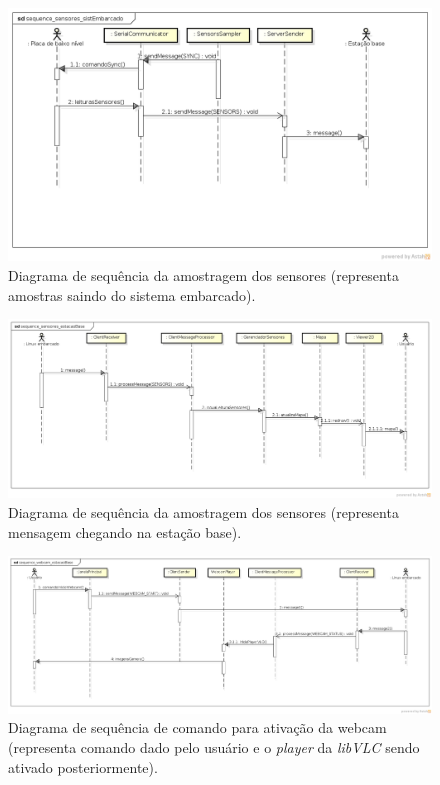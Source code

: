 \begin{figure}[H]
  \centering
  \includegraphics[width=\textwidth, keepaspectratio]{./figuras/sistEmbarcado/sequence_sensores_sistEmbarcado.png}
  \caption{Diagrama de sequência da amostragem dos sensores (representa amostras saindo do sistema embarcado).}
  \label{fig:diagrama_sequencia_sensores_sist_embarcado}
\end{figure}

\begin{figure}[H]
  \centering
  \includegraphics[width=\textwidth, keepaspectratio]{./figuras/estacaoBase/sequence_sensores_estacaoBase.png}
  \caption{Diagrama de sequência da amostragem dos sensores (representa mensagem chegando na estação base).}
  \label{fig:diagrama_sequencia_sensores_estacao_base}
\end{figure}

\begin{figure}[H]
  \centering
  \includegraphics[width=\textwidth, keepaspectratio]{./figuras/estacaoBase/sequence_webcam_estacaoBase.png}
  \caption{Diagrama de sequência de comando para ativação da webcam (representa comando dado pelo usuário e o \textit{player} da \textit{libVLC} sendo ativado posteriormente).}
  \label{fig:diagrama_sequencia_webcam_estacao_base}
\end{figure}

